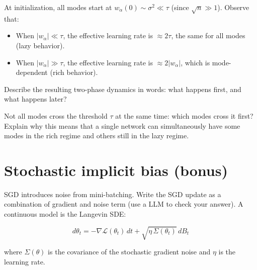 \documentclass[11pt]{article}
\providecommand{\tightlist}{%
  \setlength{\itemsep}{0pt}\setlength{\parskip}{0pt}}
\begin{document}
\begin{exercise}
\label{ex:td-5b}
At initialization, all modes
start at \(w_\alpha(0) \sim \sigma^2 \ll \tau\) (since
\(\sqrt{n} \gg 1\)). Observe that:

\begin{itemize}
\tightlist
\item
  When \(|w_\alpha| \ll \tau\), the effective learning rate is
  \(\approx 2\tau\), the same for all modes (lazy behavior).
\item
  When \(|w_\alpha| \gg \tau\), the effective learning rate is
  \(\approx 2|w_\alpha|\), which is mode-dependent (rich behavior).
\end{itemize}

Describe the resulting two-phase dynamics in words: what happens first,
and what happens later?
\end{exercise}


\begin{exercise}
\label{ex:td-5c}
Not all modes cross the
threshold \(\tau\) at the same time: which modes cross it first? Explain
why this means that a single network can simultaneously have some modes
in the rich regime and others still in the lazy regime.
\end{exercise}


\section{Stochastic implicit bias (bonus)}
\label{sec:td-stochastic}

SGD introduces noise from mini-batching. Write the SGD update as a combination of gradient and noise term (use a LLM to check your answer). A continuous model is the
Langevin SDE:

\[d\theta_t = -\nabla \mathcal{L}(\theta_t)\,dt + \sqrt{\eta\,\Sigma(\theta_t)}\,dB_t\]

where \(\Sigma(\theta)\) is the covariance of the stochastic gradient
noise and \(\eta\) is the learning rate.
\end{document}
